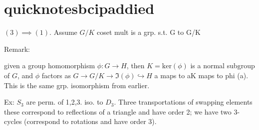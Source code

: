 \documentclass{article}
\begin{document}

\section{quicknotesbcipaddied}

\( (3) \implies (1) \). Assume \( G / K \) coset mult is a grp.  s.t. G to G/K 



Remark:

given a group homomorphism \( \phi  : G\to  H \), then \( K=\text{ker}(\phi ) \) is a normal subgroup of \( G \), and \(  \phi  \) factors as \( G \to  G / K \to  \Im(\phi ) \hookrightarrow H \)  a maps to aK maps to phi (a). This is the same grp. isomorphism from earlier. 


Ex: \( S_{3} \) are perm. of 1,2,3. iso. to \( D_{3} \). Three transportations of swapping elements these correspond to reflections of a triangle and have order 2; we have two 3-cycles (correspond to rotations and have order 3). 





\end{document}
